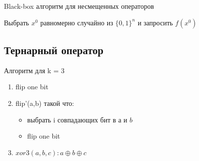 \documentclass{beamer}
\begin{document}
 \begin{frame}{Black-box алгоритм для несмещенных операторов} 
    \begin{algorithm}[H]
    \textrm{Выбрать $x^0$ равномерно случайно из $\{0,1\}^n$ и запросить $f(x^0)$ } \\
    \EndFor
    \end{algorithm}
 \end{frame}

 \subsection{Тернарный оператор}
 \begin{frame}{Алгоритм для k = 3}
    \begin{enumerate}
        \item flip one bit
        \item flip'(a,b) такой что:
        \begin{itemize}
            \item выбрать i совпадающих бит в $а$ и $b$ 
            \item flip one bit
        \end{itemize}
        
        \item $ xor3(a,b,c):  a \oplus b \oplus c $
    \end{enumerate}
 \end{frame}
\end{document}
